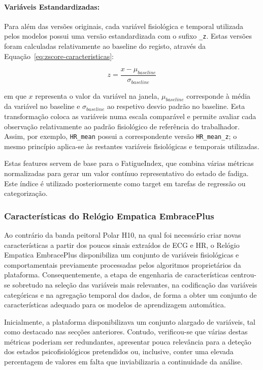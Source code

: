 \paragraph{Variáveis Estandardizadas:}
Para além das versões originais, cada variável fisiológica e temporal utilizada pelos modelos possui uma versão estandardizada com o sufixo \texttt{\_z}. Estas versões foram calculadas relativamente ao baseline do registo, através da Equação~\ref{eq:zscore-caracteristicas}:

\begin{equation}
z = \frac{x - \mu_{baseline}}{\sigma_{baseline}}
\label{eq:zscore-caracteristicas}
\end{equation}

em que $x$ representa o valor da variável na janela, $\mu_{baseline}$ corresponde à média da variável no baseline e $\sigma_{baseline}$ ao respetivo desvio padrão no baseline. Esta transformação coloca as variáveis numa escala comparável e permite avaliar cada observação relativamente ao padrão fisiológico de referência do trabalhador. Assim, por exemplo, \texttt{HR\_mean} possui a correspondente versão \texttt{HR\_mean\_z}; o mesmo princípio aplica-se às restantes variáveis fisiológicas e temporais utilizadas.

Estas features servem de base para o FatigueIndex, que combina várias métricas normalizadas para gerar um valor contínuo representativo do estado de fadiga. Este índice é utilizado posteriormente como target em tarefas de regressão ou categorização.

\subsubsection*{Características do Relógio Empatica EmbracePlus}

Ao contrário da banda peitoral Polar H10, na qual foi necessário criar novas características a partir dos poucos sinais extraídos de ECG e HR, o Relógio Empatica EmbracePlus disponibiliza um conjunto de variáveis fisiológicas e comportamentais previamente processadas pelos algoritmos proprietários da plataforma. Consequentemente, a etapa de engenharia de características centrou-se sobretudo na seleção das variáveis mais relevantes, na codificação das variáveis categóricas e na agregação temporal dos dados, de forma a obter um conjunto de características adequado para os modelos de aprendizagem automática.

Inicialmente, a plataforma disponibilizava um conjunto alargado de variáveis, tal como destacado nas secções anteriores. Contudo, verificou-se que várias destas métricas poderiam ser redundantes, apresentar pouca relevância para a deteção dos estados psicofisiológicos pretendidos ou, inclusive, conter uma elevada percentagem de valores em falta que inviabilizaria a continuidade da análise.


